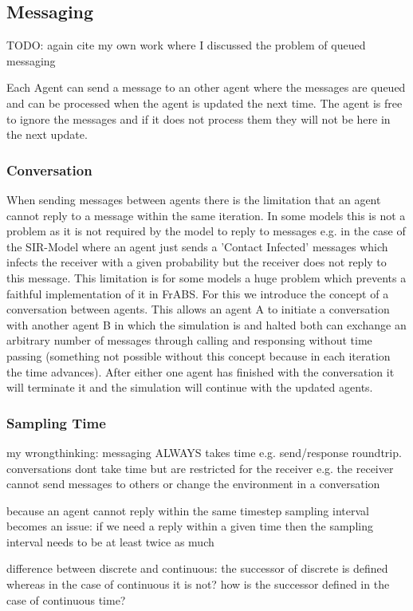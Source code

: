 \subsection{Messaging}
TODO: again cite my own work where I discussed the problem of queued messaging

Each Agent can send a message to an other agent where the messages are queued and can be processed when the agent is updated the next time. The agent is free to ignore the messages and if it does not process them they will not be here in the next update.

\subsubsection{Conversation}
When sending messages between agents there is the limitation that an agent cannot reply to a message within the same iteration. In some models this is not a problem as it is not required by the model to reply to messages e.g. in the case of the SIR-Model where an agent just sends a 'Contact Infected' messages which infects the receiver with a given probability but the receiver does not reply to this message.
This limitation is for some models a huge problem which prevents a faithful implementation of it in FrABS. For this we introduce the concept of a conversation between agents. This allows an agent A to initiate a conversation with another agent B in which the simulation is and halted both can exchange an arbitrary number of messages through calling and responsing without time passing (something not possible without this concept because in each iteration the time advances). After either one agent has finished with the conversation it will terminate it and the simulation will continue with the updated agents.

\subsubsection{Sampling Time}
my wrongthinking: messaging ALWAYS takes time e.g. send/response roundtrip. conversations dont take time but are restricted for the receiver e.g. the receiver cannot send messages to others or change the environment in a conversation

because an agent cannot reply within the same timestep sampling interval becomes an issue: if we need a reply within a given time then the sampling interval needs to be at least twice as much

difference between discrete and continuous: the successor of discrete is defined whereas in the case of continuous it is not?
how is the successor defined in the case of continuous time?